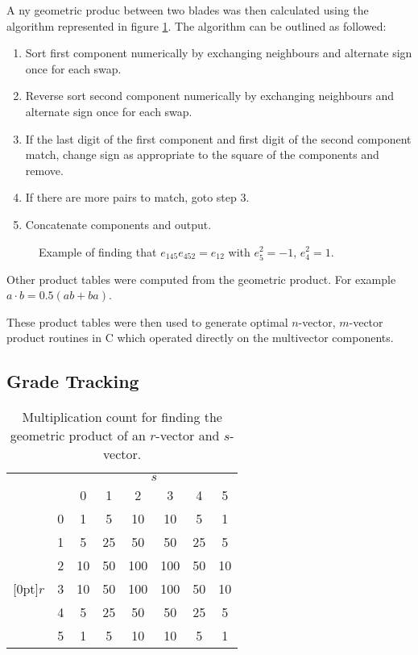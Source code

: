 A ny geometric produc between two blades was then calculated using the algorithm
represented in figure \ref{fig:symbolic}. The algorithm 
can be outlined as followed:

\begin{enumerate}
\item Sort first component numerically by exchanging neighbours and alternate sign
once for each swap.
\item Reverse sort second component numerically by exchanging neighbours and alternate sign
once for each swap.
\item If the last digit of the first component and first digit of the second
component match, change sign as appropriate to the square of the components and
remove.
\item If there are more pairs to match, goto step 3.
\item Concatenate components and output.
\end{enumerate}

\begin{figure}
\centering
{}
\caption{Example of finding that $e_{145}e_{452} = e_{12}$ with $e_5^2 = -1$, $e_4^2 = 1$.
\label{fig:symbolic}}
\end{figure}

Other product tables were computed from the geometric product. For example 
$a \cdot b = 0.5 (ab + ba)$.

These product tables were then used to generate optimal $n$-vector, $m$-vector product 
routines in C which operated directly on the multivector components.


\subsection{Grade Tracking}
\label{sec:grade_tracking}

\begin{table}
\centering
\begin{tabular}{cc|cccccc}
 \multicolumn{2}{c}{} & \multicolumn{6}{c}{$s$} \\
&  & 0 & 1 & 2 & 3 & 4 & 5 \\
\cline{2-8}
& 0 & 1 & 5 &10 &10 & 5 & 1 \\
& 1 & 5 & 25&50 &50 &25 & 5\\
& 2 & 10& 50&100&100&50 & 10\\
\raisebox{1.5ex}[0pt]{$r$} & 3 & 10& 50&100&100&50 & 10\\
& 4 & 5 & 25&50 &50 &25 & 5\\
& 5 & 1 & 5 &10 &10 & 5 & 1
\end{tabular}
\caption{Multiplication count for finding the geometric product of an
$r$-vector and $s$-vector.
\label{tab:grades}}
\end{table}

